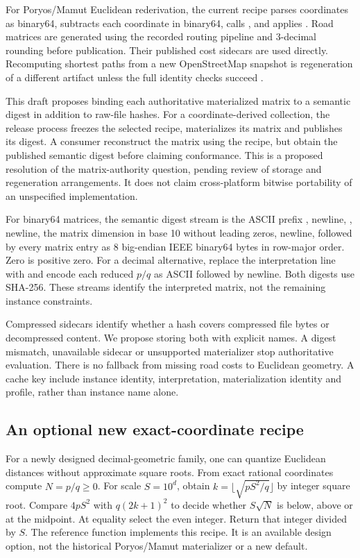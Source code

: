 For Poryos/Mamut Euclidean rederivation, the current recipe parses coordinates as binary64, subtracts each coordinate in binary64, calls , and applies . Road matrices are generated using the recorded routing pipeline and 3-decimal rounding before publication. Their published cost sidecars are used directly. Recomputing shortest paths from a new OpenStreetMap snapshot is regeneration of a different artifact unless the full identity checks succeed \autocite{pichonPoryos2026,pichonMamut2026,onyrStaticStorageAudit2026}.

This draft proposes binding each authoritative materialized matrix to a semantic digest in addition to raw-file hashes. For a coordinate-derived collection, the release process freezes the selected recipe, materializes its matrix and publishes its digest. A consumer \may{} reconstruct the matrix using the recipe, but \must{} obtain the published semantic digest before claiming conformance. This is a proposed resolution of the matrix-authority question, pending review of storage and regeneration arrangements. It does not claim cross-platform bitwise portability of an unspecified  implementation.

For binary64 matrices, the semantic digest stream is the ASCII prefix , newline, , newline, the matrix dimension in base 10 without leading zeros, newline, followed by every matrix entry as 8 big-endian IEEE binary64 bytes in row-major order. Zero is positive zero. For a decimal alternative, replace the interpretation line with  and encode each reduced $p/q$ as ASCII  followed by newline. Both digests use SHA-256. These streams identify the interpreted matrix, not the remaining instance constraints.

Compressed sidecars \must{} identify whether a hash covers compressed file bytes or decompressed content. We propose storing both with explicit names. A digest mismatch, unavailable sidecar or unsupported materializer \must{} stop authoritative evaluation. There is no fallback from missing road costs to Euclidean geometry. A cache key \must{} include instance identity, interpretation, materialization identity and profile, rather than instance name alone.

\subsection{An optional new exact-coordinate recipe}
For a newly designed decimal-geometric family, one can quantize Euclidean distances without approximate square roots. From exact rational coordinates compute $N=p/q\geq0$. For scale $S=10^d$, obtain $k=\lfloor\sqrt{pS^2/q}\rfloor$ by integer square root. Compare $4pS^2$ with $q(2k+1)^2$ to decide whether $S\sqrt{N}$ is below, above or at the midpoint. At equality select the even integer. Return that integer divided by $S$. The reference function  implements this recipe. It is an available design option, not the historical Poryos/Mamut materializer or a new default.

